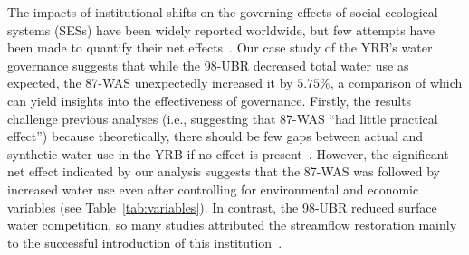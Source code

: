 
The impacts of institutional shifts on the governing effects of social-ecological systems (SESs) have been widely reported worldwide, but few attempts have been made to quantify their net effects~\cite{cumming2020a}.
Our case study of the YRB's water governance suggests that while the 98-UBR decreased total water use as expected, the 87-WAS unexpectedly increased it by $5.75\%$, a comparison of which can yield insights into the effectiveness of governance.
Firstly, the results challenge previous analyses (i.e., suggesting that 87-WAS ``had little practical effect'') because theoretically, there should be few gaps between actual and synthetic water use in the YRB if no effect is present~\cite{abadie2015,hill2021}.
However, the significant net effect indicated by our analysis suggests that the 87-WAS was followed by increased water use even after controlling for environmental and economic variables (see \textit{} Table~\ref{tab:variables}).
In contrast, the 98-UBR reduced surface water competition, so many studies attributed the streamflow restoration mainly to the successful introduction of this institution~\cite{chen2021,huangang2002,an2007}.

